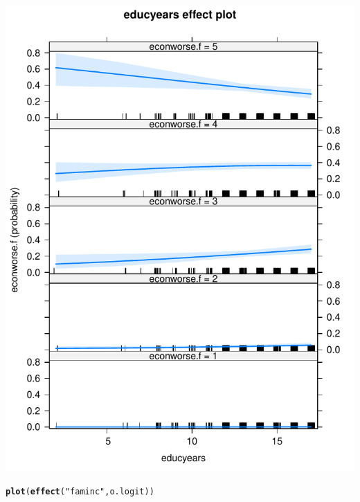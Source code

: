 \documentclass[onesided]{article}\usepackage[]{graphicx}\usepackage[]{color}
\makeatletter
\def\maxwidth{ %
  \ifdim\Gin@nat@width>\linewidth
    \linewidth
  \else
    \Gin@nat@width
  \fi
}
\newcommand{\hlstr}[1]{\textcolor[rgb]{0.192,0.494,0.8}{#1}}%
\newcommand{\hlstd}[1]{\textcolor[rgb]{0.345,0.345,0.345}{#1}}%
\newcommand{\hlkwd}[1]{\textcolor[rgb]{0.737,0.353,0.396}{\textbf{#1}}}%
\newenvironment{kframe}{%
 \def\at@end@of@kframe{}%
 \ifinner\ifhmode%
  \def\at@end@of@kframe{\end{minipage}}%
  \begin{minipage}{\columnwidth}%
 \fi\fi%
 \def\FrameCommand##1{\hskip\@totalleftmargin \hskip-\fboxsep
 \colorbox{shadecolor}{##1}\hskip-\fboxsep
     \hskip-\linewidth \hskip-\@totalleftmargin \hskip\columnwidth}%
 \MakeFramed {\advance\hsize-\width
   \@totalleftmargin\z@ \linewidth\hsize
   \@setminipage}}%
 {\par\unskip\endMakeFramed%
 \at@end@of@kframe}
\newenvironment{knitrout}{}{} %
\makeatother
\begin{document}
\begin{knitrout}
{\centering \includegraphics[width=\maxwidth]{figure/pp-2} 

}


\begin{kframe}\begin{alltt}
\hlkwd{plot}\hlstd{(}\hlkwd{effect}\hlstd{(}\hlstr{"faminc"}\hlstd{, o.logit))}
\end{alltt}
\end{kframe}


\end{knitrout}
\end{document}
